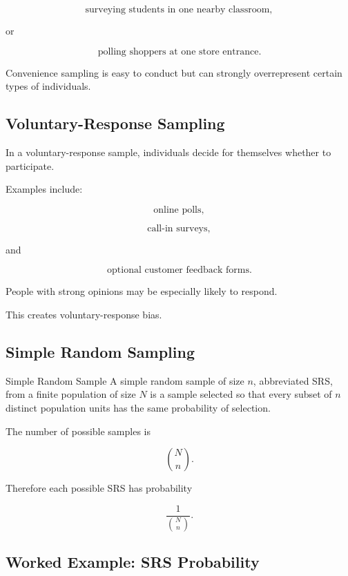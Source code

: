 \[
\text{surveying students in one nearby classroom},
\]

or

\[
\text{polling shoppers at one store entrance}.
\]

Convenience sampling is easy to conduct but can strongly overrepresent
certain types of individuals.

\subsection{Voluntary-Response Sampling}
\label{subsec:voluntary-response-sampling}

In a voluntary-response sample, individuals decide for themselves whether
to participate.

Examples include:

\[
\text{online polls},
\]

\[
\text{call-in surveys},
\]

and

\[
\text{optional customer feedback forms}.
\]

People with strong opinions may be especially likely to respond.

This creates voluntary-response bias.

\subsection{Simple Random Sampling}
\label{subsec:simple-random-sampling}

\begin{definitionbox}{Simple Random Sample}
A simple random sample of size \(n\), abbreviated SRS, from a finite
population of size \(N\) is a sample selected so that every subset of
\(n\) distinct population units has the same probability of selection.
\end{definitionbox}

The number of possible samples is

\[
\boxed{
\binom{N}{n}.
}
\]

Therefore each possible SRS has probability

\[
\boxed{
\frac1{\binom{N}{n}}.
}
\]

\subsection{Worked Example: SRS Probability}
\label{subsec:worked-srs-probability}

